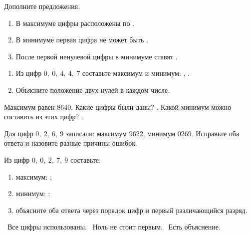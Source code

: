 \newpage
\begin{practicebox}
  Дополните предложения.
  \begin{enumerate}[label=\textbf{\arabic*.}]
    \item В максимуме цифры расположены по \answerblank[28mm].
    \item В минимуме первая цифра не может быть \answerblank[24mm].
    \item После первой ненулевой цифры в минимуме ставят \answerblank[28mm].
  \end{enumerate}
\end{practicebox}

\begin{practicebox}
  \begin{enumerate}[label=\textbf{\arabic*.}]
    \item Из цифр \(0,\ 0,\ 4,\ 4,\ 7\) составьте максимум и минимум:
      \answerblank[34mm], \answerblank[34mm].
    \item Объясните положение двух нулей в каждом числе.
  \end{enumerate}
\end{practicebox}

\begin{fillbox}
  Максимум равен \(8640\). Какие цифры были даны? \answerblank[48mm].
  Какой минимум можно составить из этих цифр? \answerblank[36mm].
\end{fillbox}

\begin{warningbox}
  Для цифр \(0,\ 2,\ 6,\ 9\) записали: максимум \(9622\), минимум \(0269\).
  Исправьте оба ответа и назовите разные причины ошибок.
\end{warningbox}

\begin{checkpointbox}[8. Итог]
  Из цифр \(0,\ 0,\ 2,\ 7,\ 9\) составьте:
  \begin{enumerate}[label=\textbf{\arabic*.}]
    \item максимум: \answerblank[38mm];
    \item минимум: \answerblank[38mm];
    \item объясните оба ответа через порядок цифр и первый различающийся
      разряд.
  \end{enumerate}
\end{checkpointbox}

\begin{reflectionbox}
  \choicebox\ Все цифры использованы. \quad
  \choicebox\ Ноль не стоит первым. \quad
  \choicebox\ Есть объяснение.
\end{reflectionbox}
